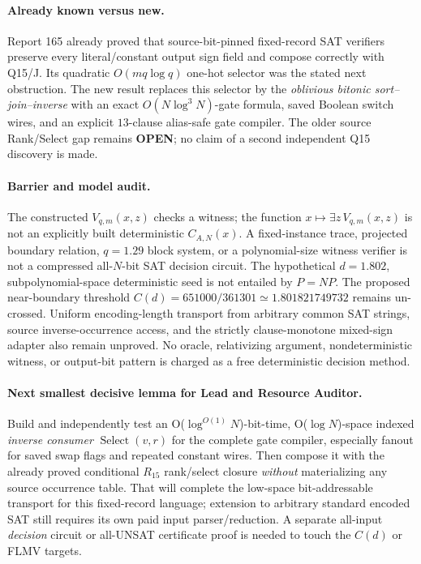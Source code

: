 \documentclass[11pt]{article}
\newcommand{\OPEN}{\textbf{OPEN}}
\begin{document}
\paragraph{Already known versus new.} Report 165 already proved that
source-bit-pinned fixed-record SAT verifiers preserve every literal/constant
output sign field and compose correctly with Q15/J. Its quadratic
$O(mq\log q)$ one-hot selector was the stated next obstruction. The
new result replaces this selector by the \emph{oblivious bitonic
sort--join--inverse} with an exact $O(N\log^3 N)$-gate formula, saved
Boolean switch wires, and an explicit $13$-clause alias-safe gate
compiler. The older source Rank/Select gap remains \OPEN; no claim of a
second independent Q15 discovery is made.

\paragraph{Barrier and model audit.} The constructed $V_{q,m}(x,z)$
checks a witness; the function $x\mapsto\exists z\,V_{q,m}(x,z)$ is not
an explicitly built deterministic $C_{A,N}(x)$. A fixed-instance trace,
projected boundary relation, $q=1.29$ block system, or a polynomial-size
witness verifier is not a compressed all-$N$-bit SAT decision circuit.
The hypothetical $d=1.802$, subpolynomial-space deterministic seed is
not entailed by $P=NP$. The proposed near-boundary threshold
$C(d)=651000/361301\simeq1.801821749732$ remains un-crossed.
Uniform encoding-length transport from arbitrary common SAT strings,
source inverse-occurrence access, and the strictly clause-monotone
mixed-sign adapter also remain unproved. No oracle, relativizing
argument, nondeterministic witness, or output-bit pattern is charged
as a free deterministic decision method.

\paragraph{Next smallest decisive lemma for Lead and Resource Auditor.}
Build and independently test an O($\log^{O(1)}N$)-bit-time,
O($\log N$)-space indexed \emph{inverse consumer}
$\operatorname{Select}(v,r)$ for the complete gate compiler, especially
fanout for saved swap flags and repeated constant wires. Then compose
it with the already proved conditional $R_{15}$ rank/select closure
\emph{without} materializing any source occurrence table. That will
complete the low-space bit-addressable transport for this fixed-record
language; extension to arbitrary standard encoded SAT still requires
its own paid input parser/reduction. A separate all-input \emph{decision}
circuit or all-UNSAT certificate proof is needed to touch the
$C(d)$ or FLMV targets.
\end{document}
